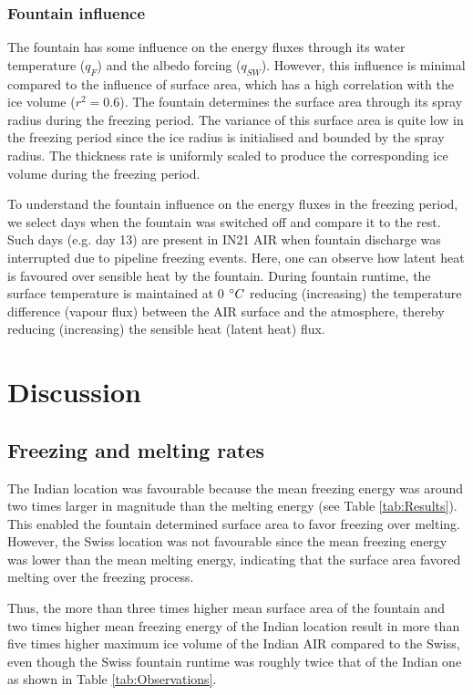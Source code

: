 \documentclass[utf8]{frontiersSCNS} %
\begin{document}
\subsubsection{Fountain influence}

The fountain has some influence on the energy fluxes through its water temperature ($q_{F}$) and the albedo forcing
($q_{SW}$). However, this influence is minimal compared to the influence of surface area, which has a high correlation with the ice volume
($r^2=0.6$). The fountain determines the surface area through its spray radius during the freezing period. The
variance of this surface area is quite low in the freezing period since the ice radius is initialised and bounded
by the spray radius. The thickness rate is uniformly scaled to produce the corresponding ice volume during the
freezing period.

To understand the fountain influence on the energy fluxes in the freezing period, we select days when the
fountain was switched off and compare it to the rest. Such days (e.g. day 13) are present in IN21 AIR when
fountain discharge was interrupted due to pipeline freezing events. Here, one can observe how latent heat is
favoured over sensible heat by the fountain. During fountain runtime, the surface temperature is maintained at 0
$\degree C$ reducing (increasing) the temperature difference (vapour flux) between the AIR surface and the
atmosphere, thereby reducing (increasing) the sensible heat (latent heat) flux.

\section{Discussion}

\subsection{Freezing and melting rates}

The Indian location was favourable because the mean freezing energy was around two times larger in magnitude than the
melting energy (see Table \ref{tab:Results}). This enabled the fountain determined surface area to favor freezing over melting. However, the
Swiss location was not favourable since the mean freezing energy was lower than the mean melting energy, indicating that the
surface area favored melting over the freezing process.

Thus, the more than three times higher mean surface area of the fountain and two times higher mean freezing energy of the Indian
location result in more than five times higher maximum ice volume of the Indian AIR compared to the Swiss, even though the Swiss
fountain runtime was roughly twice that of the Indian one as shown in Table \ref{tab:Observations}.
\end{document}
